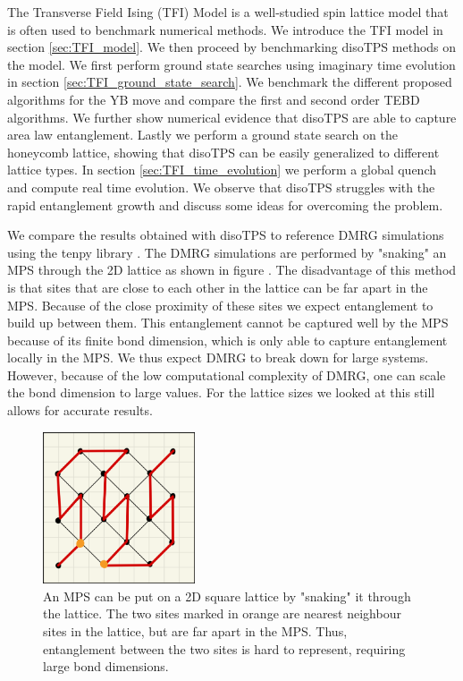 The Transverse Field Ising (TFI) Model is a well-studied spin lattice model that is often used to benchmark numerical methods. We introduce the TFI model in section \ref{sec:TFI_model}. We then proceed by benchmarking disoTPS methods on the model. We first perform ground state searches using imaginary time evolution in section \ref{sec:TFI_ground_state_search}. We benchmark the different proposed algorithms for the YB move and compare the first and second order TEBD algorithms. We further show numerical evidence that disoTPS are able to capture area law entanglement. Lastly we perform a ground state search on the honeycomb lattice, showing that disoTPS can be easily generalized to different lattice types. In section \ref{sec:TFI_time_evolution} we perform a global quench and compute real time evolution. We observe that disoTPS struggles with the rapid entanglement growth and discuss some ideas for overcoming the problem. \par
We compare the results obtained with disoTPS to reference DMRG simulations using the tenpy library \cite{cite:tenpy}. The DMRG simulations are performed by "snaking" an MPS through the 2D lattice as shown in figure . The disadvantage of this method is that sites that are close to each other in the lattice can be far apart in the MPS. Because of the close proximity of these sites we expect entanglement to build up between them. This entanglement cannot be captured well by the MPS because of its finite bond dimension, which is only able to capture entanglement locally in the MPS. We thus expect DMRG to break down for large systems. However, because of the low computational complexity of DMRG, one can scale the bond dimension to large values. For the lattice sizes we looked at this still allows for accurate results.
\begin{figure}
	\centering
	\includegraphics[width=0.4\textwidth]{figures/TFI/tenpy_snaking.jpeg}
	\caption{An MPS can be put on a 2D square lattice by "snaking" it through the lattice. The two sites marked in orange are nearest neighbour sites in the lattice, but are far apart in the MPS. Thus, entanglement between the two sites is hard to represent, requiring large bond dimensions.}
	\label{fig:tenpy_snaking}
\end{figure}



